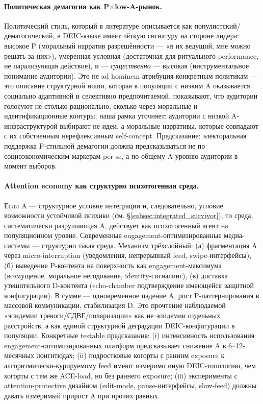 \paragraph{Политическая демагогия как P$\times$low-A-рынок.} Политический стиль, который в литературе описывается как популистский/демагогический, в DEIC-языке имеет чёткую сигнатуру на стороне лидера: высокое P (моральный нарратив разрешённости --- «я их ведущий, мне можно решать за них»), умеренная условная \EAF{} (достаточная для ритуального performance, не парализующая действие), и --- \emph{существенно} --- высокая \Ecog{} (инструментальное понимание аудитории). Это не ad hominem атрибуция конкретным политикам --- это описание структурной ниши, которая в популяции с низким A оказывается социально адаптивной и селективно предпочитаемой. \citet{westen2007, haidt2012} показывают, что аудитории голосуют не столько рационально, сколько через моральные и идентификационные контуры; наша рамка уточняет: аудитории с низкой A-инфраструктурой выбирают не идеи, а моральные нарративы, которые совпадают с их собственным нерефлексивным self-concept. Предсказание: электоральная поддержка P-стильной демагогии должна предсказываться не по социоэкономическим маркерам per se, а по общему A-уровню аудитории в момент выборов.

\paragraph{Attention economy как структурно психотогенная среда.} Если A --- структурное условие интеграции и, следовательно, условие возможности устойчивой психики (см. §\ref{subsec:integrated_survivor}), то среда, систематически разрушающая A, действует как психотогенный агент на популяционном уровне. Современные engagement-оптимизированные медиа-системы --- структурно такая среда. Механизм трёхслойный: (а) фрагментация A через micro-interruption (уведомления, непрерывный feed, swipe-интерфейсы), (б) выведение P-контента на поверхность как engagement-максимума (возмущение, моральное негодование, identity-сигналинг), (в) доставка утешительного D-контента (echo-chamber подтверждение имеющейся защитной конфигурации). В сумме --- одновременное падение A, рост P-паттернирования в массовой коммуникации, стабилизация D. Это прочтение наблюдаемой «эпидемии тревоги/СДВГ/поляризации» как не эпидемии отдельных расстройств, а как единой структурной деградации DEIC-конфигурации в популяции. Конкретные testable предсказания: (i) интенсивность использования engagement-оптимизированных платформ предсказывает снижение A в 6--12-месячных лонгитюдах; (ii) подростковые когорты с ранним exposure к алгоритмически-курируемому feed имеют измеримо иную DEIC-топологию, чем когорты с тем же ACE-load, но без раннего exposure; (iii) эксперименты с attention-protective дизайном (edit-mode, pause-интерфейсы, slow-feed) должны давать измеримый прирост A при прочих равных.

